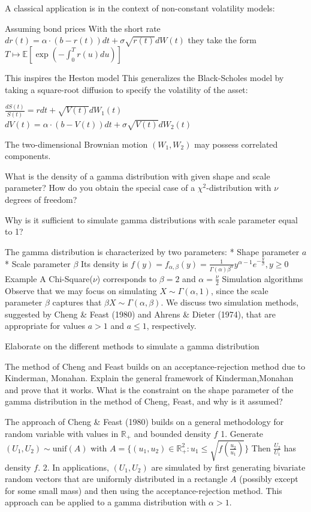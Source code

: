 A classical application is in the context of non-constant volatility models:

Assuming bond prices With the short rate
\( dr(t) = \alpha \cdot (b-r(t))dt + \sigma \sqrt{r(t)} dW(t) \)
they take the form
\( T \mapsto \mathbb{E} \left[ \exp \left( -\int_{0}^{T} r(u) du \right) \right] \)

This inspires the Heston model
This generalizes the Black-Scholes model by taking a square-root diffusion to specify the volatility of the asset:

\(\frac{dS(t)}{S(t)} = r dt + \sqrt{V(t)} dW_{1}(t)\)
\(dV(t) = \alpha \cdot (b-V(t)) dt + \sigma \sqrt{V(t)} dW_{2}(t)\)

The two-dimensional Brownian motion \((W_{1}, W_{2})\) may possess correlated components.


What is the density of a gamma distribution with given shape and scale parameter?
How do you obtain the special case of a \( \chi^{2} \)-distribution with \( \nu \) degrees of freedom?

Why is it sufficient to simulate gamma distributions with scale parameter equal to
1?


The gamma distribution is characterized by two parameters:
    * Shape parameter \(a\)
    * Scale parameter \(\beta\)
Its density is 
\(f(y) = f_{\alpha, \beta}(y) = \frac{1}{\Gamma(\alpha) \beta^\alpha} y^{\alpha-1} e^{-\frac{y}{\beta}}, y \ge 0\)
Example
A Chi-Square(\(\nu\)) corresponds to \(\beta = 2\) and \(\alpha = \frac{\nu}{2}\)
Simulation algorithms
Observe that we may focus on simulating \(X \sim \Gamma(\alpha, 1)\), since the scale parameter \(\beta\) captures that \(\beta X \sim \Gamma(\alpha, \beta)\).
We discuss two simulation methods, suggested by Cheng & Feast (1980) and Ahrens & Dieter (1974), that are appropriate for values \(a > 1\) and \(a \le 1\), respectively.

Elaborate on the different methods to simulate a gamma distribution

The method of Cheng and Feast builds on an acceptance-rejection method due
to Kinderman, Monahan. Explain the general framework of Kinderman,Monahan and prove that it works. 
What is the constraint on the shape parameter of the gamma distribution 
in the method of Cheng, Feast, and why is it assumed?

The approach of Cheng & Feast (1980) builds on a general methodology for random variable with values in \(\mathbb{R}_+\) and bounded density \(f\)
1. Generate \((U_1, U_2) \sim \text{unif}(A)\) with 
\(A = \{ (u_1, u_2) \in \mathbb{R}_+^2 : u_1 \le \sqrt{f \left( \frac{u_2}{u_1} \right) } \}\)
Then \(\frac{U_2}{U_1}\) has density \(f\).
2. In applications, \((U_1, U_2)\) are simulated by first generating bivariate random vectors that are uniformly distributed in a rectangle \(A\) (possibly except for some small mass) and then using the acceptance-rejection method.
This approach can be applied to a gamma distribution with \(\alpha > 1\).

